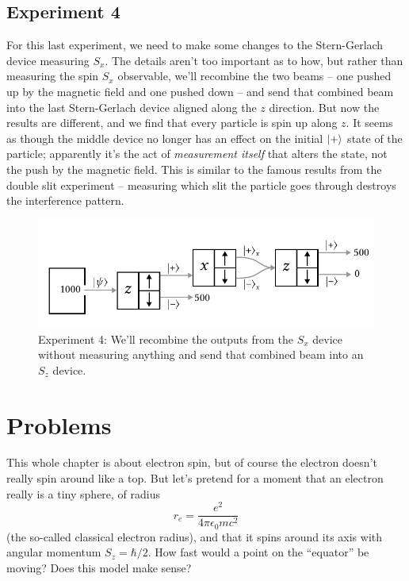 \subsection{Experiment 4}

For this last experiment, we need to make some changes to the Stern-Gerlach device measuring $S_x$.  The details aren't too important as to how, but rather than measuring the spin $S_x$ observable, we'll recombine the two beams -- one pushed up by the magnetic field and one pushed down -- and send that combined beam into the last Stern-Gerlach device aligned along the $z$ direction.  But now the results are different, and we find that every particle is spin up along $z$.  It seems as though the middle device no longer has an effect on the initial $| + \rangle$ state of the particle; apparently it's the act of \emph{measurement itself} that alters the state, not the push by the magnetic field.  This is similar to the famous results from the double slit experiment -- measuring which slit the particle goes through destroys the interference pattern.

\begin{figure}
\centering\includegraphics[width=\linewidth]{Figures/Chapter 1/fig_sg_4.pdf}
\caption{Experiment 4: We'll recombine the outputs from the $S_x$ device without measuring anything and send that combined beam into an $S_z$ device. }
\label{fig_sg_4}
\end{figure}


%
%
%


\section*{Problems}
%

\begin{problem}
This whole chapter is about electron spin, but of course the electron doesn't really spin around like a top.  But let's pretend for a moment that an electron really is a tiny sphere, of radius
\[
r_e = \frac{e^2}{4\pi \epsilon_0 mc^2}
\]
(the so-called classical electron radius), and that it spins around its axis with angular momentum $S_z = \hbar/2$.  How fast would a point on the ``equator'' be moving?  Does this model make sense? 
\end{problem}

